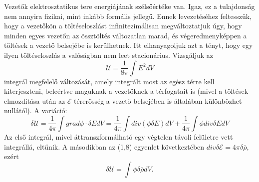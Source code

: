 \documentclass{article}
\begin{document}
Vezetők elektrosztatikus tere energiájának szélsőértéke van. Igaz, ez a tulajdonság nem annyira fizikai, mint inkább formális jellegű. Ennek levezetéséhez feltesszük, hogy a vezetőkön a töltéseloszlást infinitezimálisan megváltoztatjuk úgy, hogy minden egyes vezetőn az össztöltés változatlan marad, és végeredmenyképpen a töltések a vezető belsejébe is kerülhetnek. Itt elhanyagoljuk azt a tényt, hogy egy ilyen töltéseloszlás a valóságban nem leet stacionárius. Vizsgáljuk az
\begin{equation} \label{eq:18}
    \mathcal{U} = \frac{1}{8 \pi} \int E^2dV
\end{equation}
integrál megfelelő változását, amely integrált most az egész térre kell kiterjeszteni, beleértve maguknak a vezetőknek a térfogatait is (mivel a töltések elmozditása után az $\mathcal{E}$ térerősség a vezető belsejében is általában különbözhet nullától). A variáció:
\begin{equation} \label{eq:19}
    \delta \mathcal{U} = \frac{1}{4 \pi} \int grad \phi \cdot \delta EdV = \frac{1}{4\pi} \int div(\phi \delta E)dV + \frac{1}{4\pi} \int \phi div \delta EdV
\end{equation}
Az első integrál, mivel áttranszformálható egy végtelen távoli felületre vett integrállá, eltűnik. A másodikban az (1,8) egyenlet következtében $div \delta \mathcal{E} = 4 \pi \delta \overline\rho$, ezért
\begin{equation} \label{eq:20}
    \delta \mathcal{U} = \int \phi \delta \overline{\rho}dV.
\end{equation}
\end{document}
